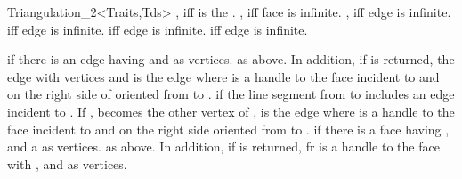 \begin{ccClassTemplate}{Triangulation_2<Traits,Tds>}
{, iff  is the .}
\ccGlue
{}
{, iff face  is infinite.}
\ccGlue
{}
{, iff edge  is infinite.}
\ccGlue
{}
{ iff edge  is infinite.}
\ccGlue
{}
{ iff edge  is infinite.}
\ccGlue
{}
{ iff edge  is infinite.}


{ if there is an edge having  and  as
vertices.}
\ccGlue
{}
{ as above. In addition, if  is returned,  the edge with
vertices  and  is the edge  where
 is a handle to the face incident to  and 
on the right side of   oriented from  to .}
\ccGlue
{}
{ if the line segment from  to  includes
an edge  incident to . If ,  becomes
the other vertex of ,  is the edge  where
 is a handle to the face incident to  and 
on the right side  oriented from  to .}
\ccGlue
{}
{ if there is a face having ,  and a 
as vertices.}
\ccGlue
{}
{as above. In addition, if  is returned, fr is a handle
to the face with  ,  and  
as vertices.} 




\end{ccClassTemplate}
